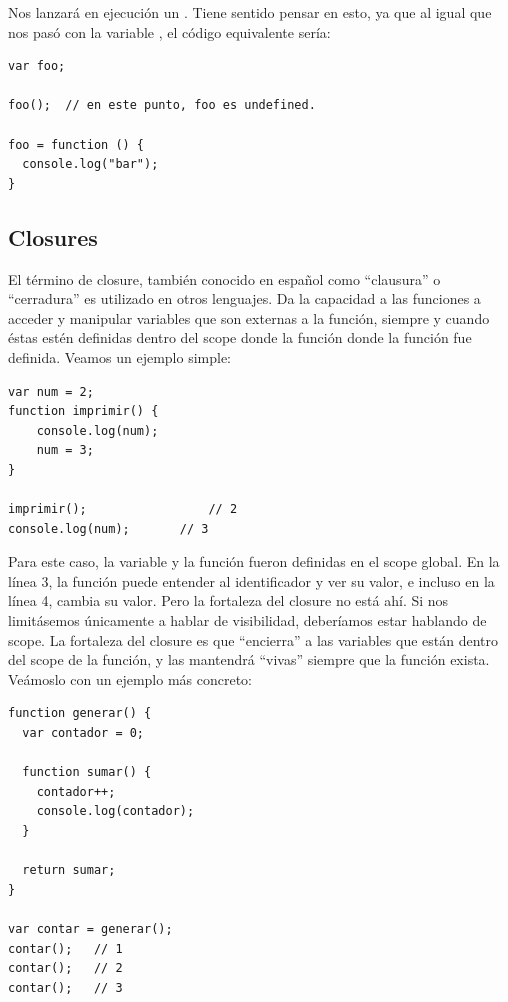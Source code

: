 Nos lanzará en ejecución un . Tiene sentido pensar en esto, ya que al igual que nos pasó con la variable , el código equivalente sería:

\begin{lstlisting}
var foo;

foo();	// en este punto, foo es undefined.

foo = function () { 
  console.log("bar");
}
\end{lstlisting}

\subsection{Closures}
\label{sec:closures}

El término de closure, también conocido en español como "`clausura"' o "`cerradura"' es utilizado en otros lenguajes. Da la capacidad a las funciones a acceder y manipular variables que son externas a la función, siempre y cuando éstas estén definidas dentro del scope donde la función donde la función fue definida. Veamos un ejemplo simple:

\begin{lstlisting}[title={Creando un closure simple}]
var num = 2;
function imprimir() {
	console.log(num);
	num = 3;
}

imprimir();					// 2
console.log(num);		// 3
\end{lstlisting}

Para este caso, la variable  y la función  fueron definidas en el scope global. En la línea 3, la función puede entender al identificador  y ver su valor, e incluso en la línea 4, cambia su valor. Pero la fortaleza del closure no está ahí. Si nos limitásemos únicamente a hablar de visibilidad, deberíamos estar hablando de scope. La fortaleza del closure es que "`encierra"' a las variables que están dentro del scope de la función, y las mantendrá "`vivas"' siempre que la función exista. Veámoslo con un ejemplo más concreto:

\begin{lstlisting}[title={Analizando otro closure}]
function generar() {
  var contador = 0;

  function sumar() {
    contador++;
    console.log(contador);
  }

  return sumar;
}

var contar = generar();
contar();	// 1
contar();	// 2
contar();	// 3
\end{lstlisting}

